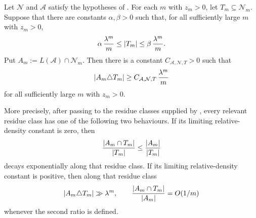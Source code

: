 \begin{corollary}
  \label{cor:relative-finite-budget-obstruction}
  Let \(\mathcal N\) and \(\mathcal A\) satisfy the hypotheses of
  . For each \(m\) with \(z_m>0\), let
  \(T_m\subseteq\mathcal N_m\). Suppose that there are constants
  \(\alpha,\beta>0\) such that, for all sufficiently large \(m\) with
  \(z_m>0\),
  \[
    \alpha\,\frac{\lambda^m}{m}
    \le \lvert T_m \rvert
    \le \beta\,\frac{\lambda^m}{m}.
  \]
  Put \(A_m:=L(\mathcal A)\cap\mathcal N_m\). Then there is a constant
  \(C_{\mathcal A,\mathcal N,T}>0\) such that
  \[
    \lvert A_m\triangle T_m \rvert
    \ge C_{\mathcal A,\mathcal N,T}\,\frac{\lambda^m}{m}
  \]
  for all sufficiently large \(m\) with \(z_m>0\).

  More precisely, after passing to the residue classes supplied by
  , every relevant residue class has one of the
  following two behaviours. If its limiting relative-density constant
  is zero, then
  \[
    \frac{\lvert A_m\cap T_m \rvert}{\lvert T_m \rvert}
    \le \frac{\lvert A_m \rvert}{\lvert T_m \rvert}
  \]
  decays exponentially along that residue class. If its limiting
  relative-density constant is positive, then along that residue class
  \[
    \lvert A_m\triangle T_m \rvert\gg \lambda^m,
    \qquad
    \frac{\lvert A_m\cap T_m \rvert}{\lvert A_m \rvert}=O(1/m)
  \]
  whenever the second ratio is defined.
\end{corollary}

